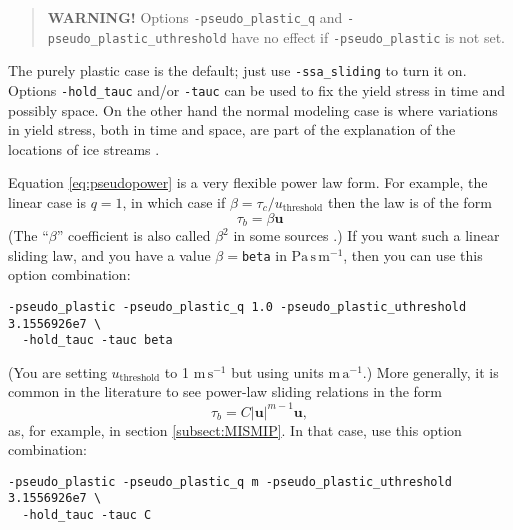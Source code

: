 \begin{quote}
  \textbf{WARNING!} Options \texttt{-pseudo_plastic_q} and \texttt{-pseudo_plastic_uthreshold} have no effect if \texttt{-pseudo_plastic} is not set.
\end{quote}

The purely plastic case is the default; just use \verb|-ssa_sliding| to turn it on.  Options \verb|-hold_tauc| and/or \verb|-tauc| can be used to fix the yield stress in time and possibly space.  On the other hand the normal modeling case is where variations in yield stress, both in time and space, are part of the explanation of the locations of ice streams \cite{SchoofStream}.

Equation \eqref{eq:pseudopower} is a very flexible power law form.  For example, the linear case is $q=1$, in which case if $\beta=\tau_c/u_{\text{threshold}}$ then the law is of the form
    $$\tau_b = \beta \mathbf{u}$$
(The ``$\beta$'' coefficient is also called $\beta^2$ in some sources \cite[for example]{MacAyeal}.)  If you want such a linear sliding law, and you have a value $\beta=$\verb|beta| in $\text{Pa}\,\text{s}\,\text{m}^{-1}$, then you can use this option combination:
\begin{verbatim}
-pseudo_plastic -pseudo_plastic_q 1.0 -pseudo_plastic_uthreshold 3.1556926e7 \
  -hold_tauc -tauc beta
\end{verbatim}
\noindent (You are setting $u_{\text{threshold}}$ to 1 $\text{m}\,\text{s}^{-1}$ but using units $\text{m}\,\text{a}^{-1}$.)  More generally, it is common in the literature to see power-law sliding relations in the form
    $$\tau_b = C |\mathbf{u}|^{m-1} \mathbf{u},$$
as, for example, in section \ref{subsect:MISMIP}.  In that case, use this option combination:
\begin{verbatim}
-pseudo_plastic -pseudo_plastic_q m -pseudo_plastic_uthreshold 3.1556926e7 \
  -hold_tauc -tauc C
\end{verbatim}

